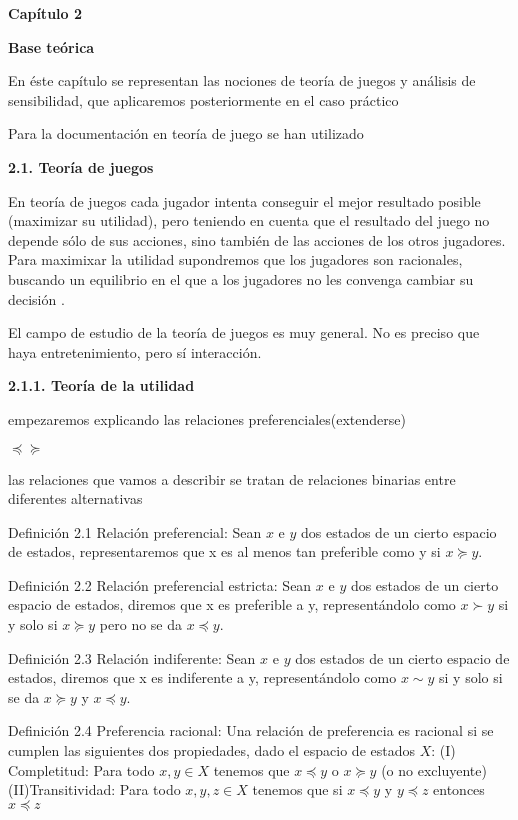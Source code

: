 \documentclass[11pt, a4paper]{article} %
\begin{document}
\newpage

{\bfseries \large Capítulo 2 }\vspace{10mm} 

{\bfseries \large Base teórica} \vspace{15mm}

En éste capítulo se representan las nociones de teoría de juegos y análisis de sensibilidad, que aplicaremos posteriormente en el caso práctico 

Para la documentación en teoría de juego se han utilizado



{\bfseries \large 2.1. Teoría de juegos} \vspace{10mm}

En teoría de juegos cada jugador intenta conseguir el mejor resultado posible (maximizar su utilidad), pero teniendo en cuenta que el resultado del juego no depende sólo de sus acciones, sino también de las acciones de los otros jugadores. Para maximixar la utilidad supondremos que los jugadores son racionales, buscando un equilibrio en el que a los jugadores no les convenga cambiar su decisión .


El campo de estudio de la teoría de juegos es muy general. No es preciso que haya
entretenimiento, pero sí interacción.

{\bfseries \large 2.1.1. Teoría de la utilidad} \vspace{5mm}

empezaremos explicando las relaciones preferenciales(extenderse)

$\preceq 
\succeq$

las relaciones que vamos a describir se tratan de relaciones binarias entre diferentes alternativas

Definición 2.1 Relación preferencial: Sean $x$ e $y$ dos estados de un cierto espacio de estados, representaremos que x es al menos tan preferible como y si $x \succeq y$. 

Definición 2.2 Relación preferencial estricta: Sean $x$ e $y$ dos estados de un cierto espacio de estados, diremos que x es preferible a y, representándolo como $x \succ y$ si y solo si $x \succeq y$ pero no se da $x \preceq y$.

Definición 2.3 Relación indiferente: Sean $x$ e $y$ dos estados de un cierto espacio de estados, diremos que x es indiferente a y, representándolo como $x \sim y$ si y solo si se da  $x \succeq y$ y $x \preceq y$.

Definición 2.4 Preferencia racional:
Una relación de preferencia es racional si se cumplen las siguientes dos propiedades, dado el espacio de estados $X$:
(I) Completitud: Para todo $x,y \in X$ tenemos que $x \preceq y$ o $x \succeq y$ (o no excluyente)
(II)Transitividad: Para todo $x, y, z \in X$ tenemos que si $x \preceq y$ y $y \preceq z$ entonces $x \preceq z$
\end{document}
